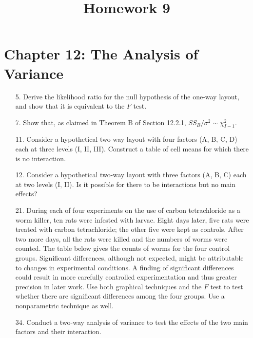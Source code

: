 \documentclass{article}
\begin{document}
\title{Homework 9}
\maketitle
\thispagestyle{fancy}

\section*{Chapter 12: The Analysis of Variance}

\begin{itemize}
	\item[5.] Derive the likelihood ratio for the null hypothesis of the one-way layout, and show that it is equivalent to the $F$ test.

	\item[7.] Show that, as claimed in Theorem B of Section 12.2.1, $SS_B/\sigma^2\sim\chi_{I-1}^2.$

	\item[11.] Consider a hypothetical two-way layout with four factors (A, B, C, D) each at three levels (I, II, III). Construct a table of cell means for which there is no interaction.

	\item[12.] Consider a hypothetical two-way layout with three factors (A, B, C) each at two levels (I, II). Is it possible for there to be interactions but no main effects?

	\item[21.] During each of four experiments on the use of carbon tetrachloride as a worm killer, ten rats were infested with larvae. Eight days later, five rats were treated with carbon tetrachloride; the other five were kept as controls. After two more days, all the rats were killed and the numbers of worms were counted. The table below gives the counts of worms for the four control groups. Significant differences, although not expected, might be attributable to changes in experimental conditions. A finding of significant differences could result in more carefully controlled experimentation and thus greater precision in later work. Use both graphical techniques and the $F$ test to test whether there are significant differences among the four groups. Use a nonparametric technique as well.

	\item[34.] Conduct a two-way analysis of variance to test the effects of the two main factors and their interaction.

\end{itemize}
\end{document}

